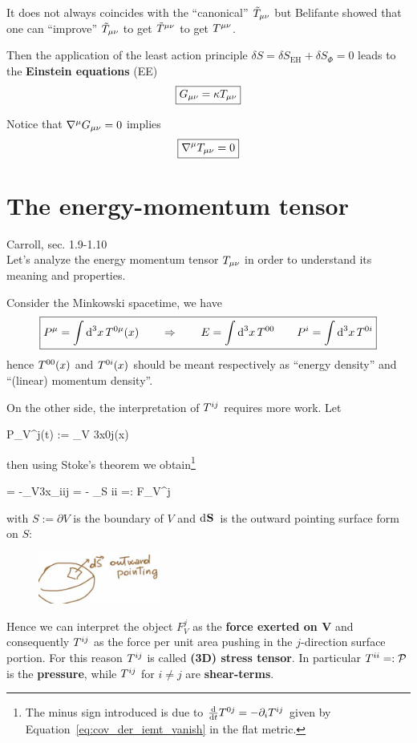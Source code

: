 \documentclass[../main/main.tex]{subfiles}
\begin{document}
It does not always coincides with the ``canonical'' $\tilde T_{\mu \nu}$ but Belifante showed that one can ``improve'' $\tilde T_{\mu \nu}$ to get $\tilde T^{\mu \nu}$ to get $T^{\mu \nu}$. 

Then the application of the least action principle $\delta S=\delta S_{\text{EH}}+\delta S_\Phi=0$ leads to the \textbf{Einstein equations} (EE)
\begin{equation}\boxed{
G_{\mu \nu}=\kappa T_{\mu \nu}
}\end{equation}

Notice that $\nabla^{\mu}G_{\mu \nu}=0$ implies
\begin{equation}\boxed{
\nabla^{\mu}T_{\mu \nu}=0
}\end{equation}


\section{The energy-momentum tensor}

\textsf{Carroll, sec. 1.9-1.10}\\

Let's analyze the energy momentum tensor $T_{\mu \nu}$ in order to understand its meaning and properties. 

Consider the Minkowski spacetime, we have
\begin{equation}\label{eq:cov_der_iemt_vanish}\boxed{
P^\mu=\int\textup{d}^{3}{x}\,T^{0 \mu}(x)\qquad\Rightarrow\qquad E=\int\textup{d}^{3}{x}\,T^{0 0}\qquad P^i=\int\textup{d}^{3}{x}\,T^{0 i}
}\end{equation}
hence $T^{0 0}(x)$ and $T^{0 i}(x)$ should be meant respectively as ``energy density'' and ``(linear) momentum density''. 

On the other side, the interpretation of $T^{i j}$ requires  more work. Let
\begin{eqalign}
	P_V^j(t) := \int_V \diff3x\iemt0j(x)
\end{eqalign}
then using Stoke's theorem we obtain\footnote{The minus sign introduced is due to $\frac{\textup{d} }{\textup{d} t}T^{0 j} = - \partial_iT^{i j}$ given by Equation~\eqref{eq:cov_der_iemt_vanish} in the flat metric.}
\begin{eqalign}
	 = -\int_V\diff3x\partial_i\iemt ij = - \int_S  \iemt ii =: F_V^j
\end{eqalign}
with $S:=\partial V$ is the boundary of $V$ and $\textup{d}^{}{\mathbf S}\,$ is the outward pointing surface form on $S$: 
\begin{figure}[H]
\centering
\includegraphics[width=4cm]{../img/surf_form.jpg}
\end{figure}
\noindent
Hence we can interpret the object $F_V^j$ as the \textbf{force exerted on V} and consequently $T^{i j}$ as the force per unit area pushing in the $j$-direction surface portion. For this reason $T^{i j}$ is called \textbf{(3D) stress tensor}. In particular $T^{i i} =: \mathcal P$ is the \textbf{pressure}, while $T^{i j}$ for $i\neq j$ are \textbf{shear-terms}.
\end{document}
